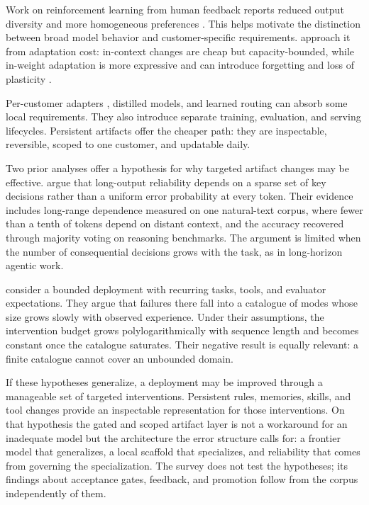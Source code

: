 Work on reinforcement learning from human feedback reports reduced output diversity and more homogeneous preferences \citep{kirk2024understanding, padmakumar2023diversity}. This helps motivate the distinction between broad model behavior and customer-specific requirements. \citet{tiwari2026fastandslow} approach it from adaptation cost: in-context changes are cheap but capacity-bounded, while in-weight adaptation is more expressive and can introduce forgetting and loss of plasticity \citep{dohare2024loss}.

Per-customer adapters \citep{hu2021lora}, distilled models, and learned routing can absorb some local requirements. They also introduce separate training, evaluation, and serving lifecycles. Persistent artifacts offer the cheaper path: they are inspectable, reversible, scoped to one customer, and updatable daily.

Two prior analyses offer a hypothesis for why targeted artifact changes may be effective. \citet{arbuzov2025beyond} argue that long-output reliability depends on a sparse set of key decisions rather than a uniform error probability at every token. Their evidence includes long-range dependence measured on one natural-text corpus, where fewer than a tenth of tokens depend on distant context, and the accuracy recovered through majority voting on reasoning benchmarks. The argument is limited when the number of consequential decisions grows with the task, as in long-horizon agentic work.

\citet{arbuzov2026architecture} consider a bounded deployment with recurring tasks, tools, and evaluator expectations. They argue that failures there fall into a catalogue of modes whose size grows slowly with observed experience. Under their assumptions, the intervention budget grows polylogarithmically with sequence length and becomes constant once the catalogue saturates. Their negative result is equally relevant: a finite catalogue cannot cover an unbounded domain.

If these hypotheses generalize, a deployment may be improved through a manageable set of targeted interventions. Persistent rules, memories, skills, and tool changes provide an inspectable representation for those interventions. On that hypothesis the gated and scoped artifact layer is not a workaround for an inadequate model but the architecture the error structure calls for: a frontier model that generalizes, a local scaffold that specializes, and reliability that comes from governing the specialization. The survey does not test the hypotheses; its findings about acceptance gates, feedback, and promotion follow from the corpus independently of them.
